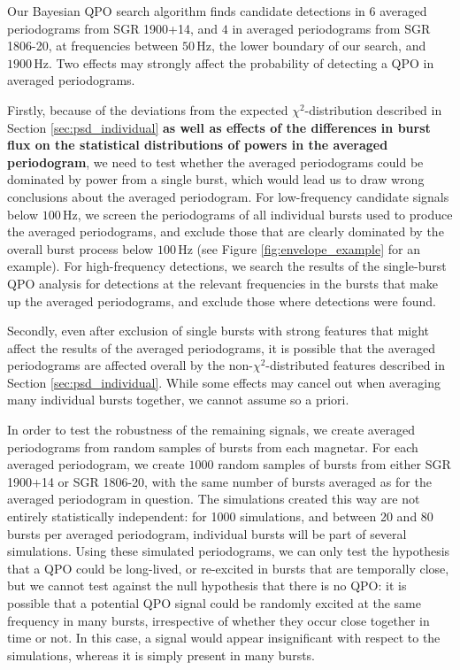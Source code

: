 \documentclass[numberedappendix]{emulateapj}
\newcommand{\hz}{\,\mathrm{Hz}}
\begin{document}
Our Bayesian QPO search algorithm finds candidate detections in $6$ averaged periodograms from SGR 1900+14, and $4$ in averaged periodograms from SGR 1806-20, at frequencies between $50 \hz$, the lower boundary of our search, and $1900 \hz$. 
Two effects may strongly affect the probability of detecting a QPO in averaged periodograms.

Firstly, because of the deviations from the expected $\chi^2$-distribution described in Section \ref{sec:psd_individual} \textbf{as well as effects of the differences in burst flux on the statistical distributions of powers in the averaged periodogram}, we need to test whether the averaged periodograms could be dominated by power from a single burst, which would lead us to draw wrong conclusions about the averaged periodogram. For low-frequency candidate signals below $100 \hz$, we screen the periodograms of all individual bursts used to produce the averaged periodograms, and exclude those that are clearly dominated by the overall burst process below $100 \hz$ (see Figure \ref{fig:envelope_example} for an example). For high-frequency detections, we search the results of the single-burst QPO analysis for detections at the relevant frequencies in the bursts that make up the averaged periodograms, and exclude those where detections were found. 

Secondly, even after exclusion of single bursts with strong features that might affect the results of the averaged periodograms, it is possible that the averaged periodograms are affected overall by the non-$\chi^2$-distributed features described in Section \ref{sec:psd_individual}. While some effects may cancel out when averaging many individual bursts together, we cannot assume so a priori. 

In order to test the robustness of the remaining signals, we create averaged periodograms from random samples of bursts from each magnetar. For each averaged periodogram, we create $1000$ random samples of bursts from either SGR 1900+14 or SGR 1806-20, with the same number of bursts averaged as for the averaged periodogram in question. The simulations created this way are not entirely statistically independent: for 1000 simulations, and between 20 and 80 bursts per averaged periodogram, individual bursts will be part of several simulations. Using these simulated periodograms, we can only test the hypothesis that a QPO could be long-lived, or re-excited in bursts that are temporally close, but we cannot test against the null hypothesis that there is no QPO: it is possible that a potential QPO signal could be randomly excited at the same frequency in many bursts, irrespective of whether they occur close together in time or not. In this case, a signal would appear insignificant with respect to the simulations, whereas it is simply present in many bursts. 
\end{document}

